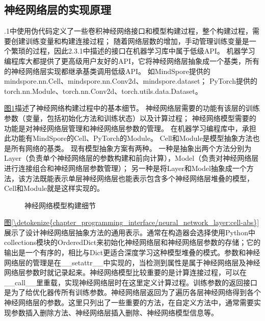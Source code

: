 \documentclass[letterpaper,10pt,english]{sphinxmanual}
\let\sphinxpxdimen\pdfpxdimen\else\newdimen\sphinxpxdimen
\begin{document}
\subsection{神经网络层的实现原理}
\label{\detokenize{chapter_programming_interface/neural_network_layer:id3}}
.1中使用伪代码定义了一些卷积神经网络接口和模型构建过程，整个构建过程，需要创建训练变量和构建连接过程；
随着网络层数的增加，手动管理训练变量是一个繁琐的过程，因此2.3.1中描述的接口在机器学习库中属于低级API。
机器学习编程库大都提供了更高级用户友好的API，它将神经网络层抽象成一个基类，所有的神经网络层实现都继承基类调用低级API。
如MindSpore提供的mindspore.nn.Cell、mindspore.nn.Conv2d、mindspore.dataset；
PyTorch提供的torch.nn.Module、torch.nn.Conv2d、torch.utils.data.Dataset。

\sphinxAtStartPar
\hyperref[\detokenize{chapter_programming_interface/neural_network_layer:model-build}]{图\ref{\detokenize{chapter_programming_interface/neural_network_layer:model-build}}}描述了神经网络构建过程中的基本细节。
神经网络层需要的功能有该层的训练参数（变量，包括初始化方法和训练状态）以及计算过程；
神经网络模型需要的功能是对神经网络层管理和神经网络层参数的管理。
在机器学习编程库中，承担此功能有MindSpore的Cell、PyTorch的Module。
Cell和Module是模型抽象方法也是所有网络的基类。 现有模型抽象方案有两种。
一种是抽象出两个方法分别为Layer（负责单个神经网络层的参数构建和前向计算），Model（负责对神经网络层进行连接组合和神经网络层参数管理）；
另一种是将Layer和Model抽象成一个方法，该方法既能表示单层神经网络层也能表示包含多个神经网络层堆叠的模型，Cell和Module就是这样实现的。

\begin{figure}[H]
\centering
\capstart

\noindent\sphinxincludegraphics[width=800\sphinxpxdimen]{{model_build}.svg}
\caption{神经网络模型构建细节}\label{\detokenize{chapter_programming_interface/neural_network_layer:id12}}\label{\detokenize{chapter_programming_interface/neural_network_layer:model-build}}\end{figure}

\sphinxAtStartPar
\hyperref[\detokenize{chapter_programming_interface/neural_network_layer:cell-abs}]{图\ref{\detokenize{chapter_programming_interface/neural_network_layer:cell-abs}}}展示了设计神经网络层抽象方法的通用表示。通常在构造器会选择使用Python中collections模块的OrderedDict来初始化神经网络层和神经网络层参数的存储；它的输出是一个有序的，相比与Dict更适合深度学习这种模型堆叠的模式。参数和神经网络层的管理是在\_\_setattr\_\_中实现的，当检测到属性是属于神经网络层及神经网络层参数时就记录起来。神经网络模型比较重要的是计算连接过程，可以在\_\_call\_\_里重载，实现神经网络层时在这里定义计算过程。训练参数的返回接口是为了给优化器传所有训练参数。神经网络层返回为了遍历各层神经网络得到各个神经网络层的参数。这里只列出了一些重要的方法，在自定义方法中，通常需要实现参数插入删除方法、神经网络层插入删除、神经网络模型信息等。
\end{document}
